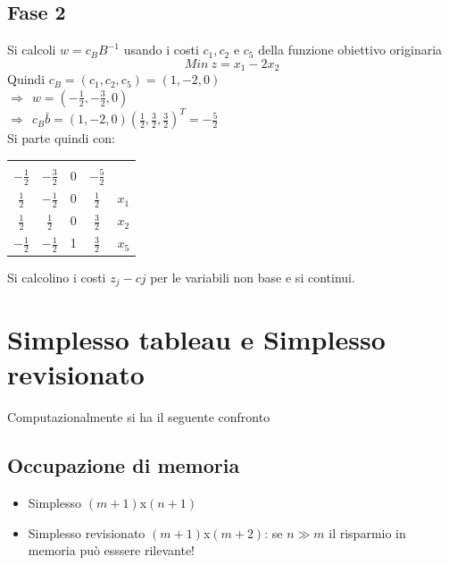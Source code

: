 \subsection{Fase 2}
Si calcoli $w=c_{B}B^{-1}$ usando i costi $c_{1},c_{2}$ e $c_{5}$ della funzione obiettivo originaria
\begin{equation*}
	Min\ z=x_{1}-2x_{2}
\end{equation*}
Quindi $c_{B}=(c_{1},c_{2},c_{5})=(1,-2,0)$\\
$\Rightarrow\ \ w=(-\frac{1}{2},-\frac{3}{2},0)$\\
$\Rightarrow\ \ c_{B}\bar{b}=(1,-2,0)(\frac{1}{2},\frac{3}{2},\frac{3}{2})^{T}=-\frac{5}{2}$\\
Si parte quindi con:
\begin{table}[h]
	\centering
	\def\arraystretch{2}
	\begin{tabular}{|ccc|c|c}
		\multicolumn{1}{c}{} & & \multicolumn{1}{c}{} & \multicolumn{1}{c}{} & \\ \cline{1-4}
		$-\frac{1}{2}$ & $-\frac{3}{2}$ & 0 & $-\frac{5}{2}$ & \\ \cline{1-4}
		$\frac{1}{2}$  & $-\frac{1}{2}$ & 0 & $\frac{1}{2}$ & $x_{1}$ \\
		$\frac{1}{2}$  & $\frac{1}{2}$ & 0 & $\frac{3}{2}$ & $x_{2}$ \\
		$-\frac{1}{2}$ & $-\frac{1}{2}$ & 1 & $\frac{3}{2}$ & $x_{5}$ \\ \cline{1-4}
	\end{tabular}
\end{table}

Si calcolino i costi $z_{j}-c{j}$ per le variabili non base e si continui.

\section{Simplesso tableau e Simplesso revisionato}
Computazionalmente si ha il seguente confronto

\subsection{Occupazione di memoria}
\begin{itemize}
	\item Simplesso $(m+1)$x$(n+1)$
	\item Simplesso revisionato $(m+1)$x$(m+2)$: se $n\gg m$ il risparmio in memoria può esssere rilevante!
\end{itemize}

